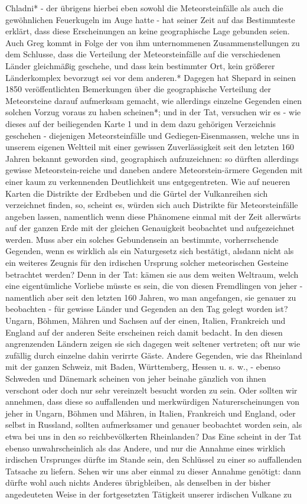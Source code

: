 \documentclass[a4paper, 8pt, oneside, polutonikogreek, german]{article}
\begin{document}
Chladni* - der übrigens hierbei eben sowohl die Meteorsteinfälle als auch die gewöhnlichen Feuerkugeln im Auge hatte - hat seiner Zeit auf das Bestimmteste erklärt, dass diese Erscheinungen an keine geographische Lage gebunden seien. Auch Greg kommt in Folge der von ihm unternommenen Zusammenstellungen zu dem Schlusse, dass die Verteilung der Meteorsteinfälle auf die verschiedenen Länder gleichmäßig geschehe, und dass kein bestimmter Ort, kein größerer Länderkomplex bevorzugt sei vor dem anderen.* Dagegen hat Shepard in seinen 1850 veröffentlichten Bemerkungen über die geographische Verteilung der Meteorsteine darauf aufmerksam gemacht, wie allerdings einzelne Gegenden einen solchen Vorzug voraus zu haben scheinen*; und in der Tat, versuchen wir es - wie dieses auf der beiliegenden Karte 1 und in dem dazu gehörigen Verzeichnis geschehen - diejenigen Meteorsteinfälle und Gediegen-Eisenmassen, welche uns in unserem eigenen Weltteil mit einer gewissen Zuverlässigkeit seit den letzten 160 Jahren bekannt geworden sind, geographisch aufzuzeichnen: so dürften allerdings gewisse Meteorstein-reiche und daneben andere Meteorstein-ärmere Gegenden mit einer kaum zu verkennenden Deutlichkeit uns entgegentreten. Wie auf neueren Karten die Distrikte der Erdbeben und die Gürtel der Vulkanreihen sich verzeichnet finden, so, scheint es, würden sich auch Distrikte für Meteorsteinfälle angeben lassen, namentlich wenn diese Phänomene einmal mit der Zeit allerwärts auf der ganzen Erde mit der gleichen Genauigkeit beobachtet und aufgezeichnet werden. Muss aber ein solches Gebundensein an bestimmte, vorherrschende Gegenden, wenn es wirklich als ein Naturgesetz sich bestätigt, alsdann nicht als ein weiteres Zeugnis für den irdischen Ursprung solcher meteorischen Gesteine betrachtet werden? Denn in der Tat: kämen sie aus dem weiten Weltraum, welch eine eigentümliche Vorliebe müsste es sein, die von diesen Fremdlingen von jeher - namentlich aber seit den letzten 160 Jahren, wo man angefangen, sie genauer zu beobachten - für gewisse Länder und Gegenden an den Tag gelegt worden ist? Ungarn, Böhmen, Mähren und Sachsen auf der einen, Italien, Frankreich und England auf der anderen Seite erscheinen reich damit bedacht. In den diesen angrenzenden Ländern zeigen sie sich dagegen weit seltener vertreten; oft nur wie zufällig durch einzelne dahin verirrte Gäste. Andere Gegenden, wie das Rheinland mit der ganzen Schweiz, mit Baden, Württemberg, Hessen u. s. w., - ebenso Schweden und Dänemark scheinen von jeher beinahe gänzlich von ihnen verschont oder doch nur sehr vereinzelt besucht worden zu sein. Oder sollten wir annehmen, dass diese so auffallenden und merkwürdigen Naturerscheinungen von jeher in Ungarn, Böhmen und Mähren, in Italien, Frankreich und England, oder selbst in Russland, sollten aufmerksamer und genauer beobachtet worden sein, als etwa bei uns in den so reichbevölkerten Rheinlanden? Das Eine scheint in der Tat ebenso unwahrscheinlich als das Andere, und nur die Annahme eines wirklich irdischen Ursprunges dürfte im Stande sein, den Schlüssel zu einer so auffallenden Tatsache zu liefern. Sehen wir uns aber einmal zu dieser Annahme genötigt: dann dürfte wohl auch nichts Anderes übrigbleiben, als denselben in der bisher angedeuteten Weise in der fortgesetzten Tätigkeit unserer irdischen Vulkane zu 
\end{document}
